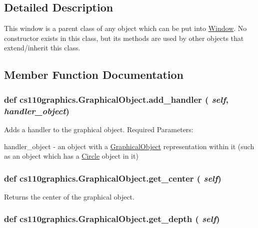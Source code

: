 \subsection{Detailed Description}
This window is a parent class of any object which can be put into \hyperlink{classcs110graphics_1_1Window}{Window}. No constructor exists in this class, but its methods are used by other objects that extend/inherit this class. 

\subsection{Member Function Documentation}
\hypertarget{classcs110graphics_1_1GraphicalObject_adb1af0d5a6baae3f9a08d21a3227c49f}{
\subsubsection[{add\_\-handler}]{\setlength{\rightskip}{0pt plus 5cm}def cs110graphics.GraphicalObject.add\_\-handler ( {\em self}, \/   {\em handler\_\-object})}}
\label{classcs110graphics_1_1GraphicalObject_adb1af0d5a6baae3f9a08d21a3227c49f}


Adds a handler to the graphical object. Required Parameters:
\begin{DoxyItemize}
\item handler\_\-object -\/ an object with a \hyperlink{classcs110graphics_1_1GraphicalObject}{GraphicalObject} representation within it (such as an object which has a \hyperlink{classcs110graphics_1_1Circle}{Circle} object in it) 
\end{DoxyItemize}\hypertarget{classcs110graphics_1_1GraphicalObject_a062789c4cc9de38af32dcc4ff2058607}{
\subsubsection[{get\_\-center}]{\setlength{\rightskip}{0pt plus 5cm}def cs110graphics.GraphicalObject.get\_\-center ( {\em self})}}
\label{classcs110graphics_1_1GraphicalObject_a062789c4cc9de38af32dcc4ff2058607}


Returns the center of the graphical object. \hypertarget{classcs110graphics_1_1GraphicalObject_a6d9f5718cd0cf249e0d2842971bae17f}{
\subsubsection[{get\_\-depth}]{\setlength{\rightskip}{0pt plus 5cm}def cs110graphics.GraphicalObject.get\_\-depth ( {\em self})}}
\label{classcs110graphics_1_1GraphicalObject_a6d9f5718cd0cf249e0d2842971bae17f}


